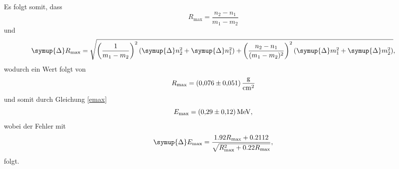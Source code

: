 Es folgt somit, dass
\begin{equation}
    R_\text{max} = \frac{n_2-n_1}{m_1-m_2}
\end{equation}
und
\begin{equation}
    \symup{\Delta}R_\text{max} = \sqrt{
        \left( \frac{1}{m_1-m_2} \right) ^2 (\symup{\Delta}n_2^2 + \symup{\Delta}n_1^2) +
        \left( \frac{n_2-n_1}{(m_1-m_2)^2}\right) ^2 \left(\symup{\Delta}m_1^2 + \symup{\Delta}m_2^2 \right)
        },
\end{equation}
wodurch ein Wert folgt von
\begin{equation}
    R_\text{max} = \SI{0.076\pm0.051}{\gram\per\centi\meter\squared}
\end{equation}
und somit durch Gleichung \eqref{emax}
\begin{equation}
    E_\text{max} = \SI{0.29\pm0.12}{\mega\electronvolt},
\end{equation}
wobei der Fehler mit
\begin{equation}
    \symup{\Delta}E_\text{max} = \frac{1.92 R_\text{max} + 0.2112}{\sqrt{R_\text{max}^2+0.22R_\text{max}}},
\end{equation}
folgt.

